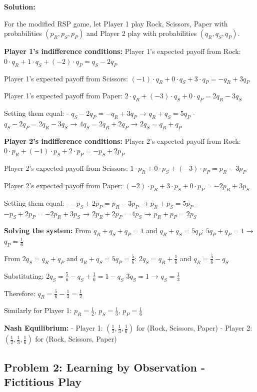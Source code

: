 \documentclass[12pt]{article}
\begin{document}
{{{{\textbf{Solution:}

For the modified RSP game, let Player 1 play Rock, Scissors, Paper with probabilities $(p_R, p_S, p_P)$ and Player 2 play with probabilities $(q_R, q_S, q_P)$.

\textbf{Player 1's indifference conditions:}
Player 1's expected payoff from Rock: $0 \cdot q_R + 1 \cdot q_S + (-2) \cdot q_P = q_S - 2q_P$

Player 1's expected payoff from Scissors: $(-1) \cdot q_R + 0 \cdot q_S + 3 \cdot q_P = -q_R + 3q_P$

Player 1's expected payoff from Paper: $2 \cdot q_R + (-3) \cdot q_S + 0 \cdot q_P = 2q_R - 3q_S$

Setting them equal:
- $q_S - 2q_P = -q_R + 3q_P$ → $q_R + q_S = 5q_P$
- $q_S - 2q_P = 2q_R - 3q_S$ → $4q_S = 2q_R + 2q_P$ → $2q_S = q_R + q_P$

\textbf{Player 2's indifference conditions:}
Player 2's expected payoff from Rock: $0 \cdot p_R + (-1) \cdot p_S + 2 \cdot p_P = -p_S + 2p_P$

Player 2's expected payoff from Scissors: $1 \cdot p_R + 0 \cdot p_S + (-3) \cdot p_P = p_R - 3p_P$

Player 2's expected payoff from Paper: $(-2) \cdot p_R + 3 \cdot p_S + 0 \cdot p_P = -2p_R + 3p_S$

Setting them equal:
- $-p_S + 2p_P = p_R - 3p_P$ → $p_R + p_S = 5p_P$
- $-p_S + 2p_P = -2p_R + 3p_S$ → $2p_R + 2p_P = 4p_S$ → $p_R + p_P = 2p_S$

\textbf{Solving the system:}
From $q_R + q_S + q_P = 1$ and $q_R + q_S = 5q_P$:
$5q_P + q_P = 1$ → $q_P = \frac{1}{6}$

From $2q_S = q_R + q_P$ and $q_R + q_S = 5q_P = \frac{5}{6}$:
$2q_S = q_R + \frac{1}{6}$ and $q_R = \frac{5}{6} - q_S$

Substituting: $2q_S = \frac{5}{6} - q_S + \frac{1}{6} = 1 - q_S$
$3q_S = 1$ → $q_S = \frac{1}{3}$

Therefore: $q_R = \frac{5}{6} - \frac{1}{3} = \frac{1}{2}$

Similarly for Player 1: $p_R = \frac{1}{2}$, $p_S = \frac{1}{3}$, $p_P = \frac{1}{6}$

\textbf{Nash Equilibrium:} 
- Player 1: $(\frac{1}{2}, \frac{1}{3}, \frac{1}{6})$ for (Rock, Scissors, Paper)
- Player 2: $(\frac{1}{2}, \frac{1}{3}, \frac{1}{6})$ for (Rock, Scissors, Paper)

\subsection{Problem 2: Learning by Observation - Fictitious Play}

}}}}
\end{document}
